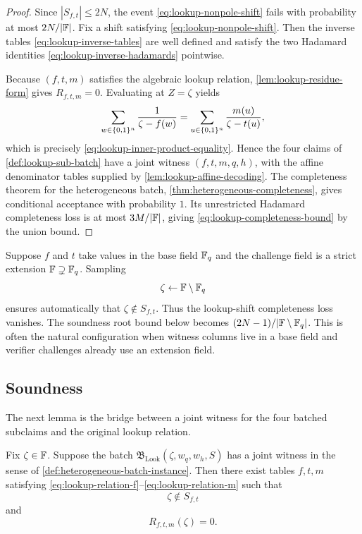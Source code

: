 \begin{proof}
Since $|S_{f,t}|\le2N$, the event \eqref{eq:lookup-nonpole-shift} fails with probability at most $2N/|\mathbb{F}|$.  Fix a shift satisfying \eqref{eq:lookup-nonpole-shift}.  Then the inverse tables \eqref{eq:lookup-inverse-tables} are well defined and satisfy the two Hadamard identities \eqref{eq:lookup-inverse-hadamards} pointwise.

Because $(f,t,m)$ satisfies the algebraic lookup relation, \cref{lem:lookup-residue-form} gives $R_{f,t,m}=0$.  Evaluating at $Z=\zeta$ yields
\[
  \sum_{w\in\{0,1\}^n}\frac{1}{\zeta-f(w)}
  =
  \sum_{u\in\{0,1\}^n}\frac{m(u)}{\zeta-t(u)},
\]
which is precisely \eqref{eq:lookup-inner-product-equality}.  Hence the four claims of \cref{def:lookup-sub-batch} have a joint witness $(f,t,m,q,h)$, with the affine denominator tables supplied by \cref{lem:lookup-affine-decoding}.  The completeness theorem for the heterogeneous batch, \cref{thm:heterogeneous-completeness}, gives conditional acceptance with probability $1$.  Its unrestricted Hadamard completeness loss is at most $3M/|\mathbb{F}|$, giving \eqref{eq:lookup-completeness-bound} by the union bound.
\end{proof}

\begin{remark}
\label{rem:lookup-extension-shift}
Suppose $f$ and $t$ take values in the base field $\mathbb{F}_q$ and the challenge field is a strict extension $\mathbb{F}\supsetneq\mathbb{F}_q$.  Sampling
\begin{equation}
  \zeta\leftarrow \mathbb{F}\setminus\mathbb{F}_q
  \label{eq:lookup-extension-challenge}
\end{equation}
ensures automatically that $\zeta\notin S_{f,t}$.  Thus the lookup-shift completeness loss vanishes.  The soundness root bound below becomes $(2N-1)/|\mathbb{F}\setminus\mathbb{F}_q|$.  This is often the natural configuration when witness columns live in a base field and verifier challenges already use an extension field.
\end{remark}

\subsection{Soundness}
\label{sec:lookup-soundness}

The next lemma is the bridge between a joint witness for the four batched subclaims and the original lookup relation.

\begin{lemma}
\label{lem:lookup-joint-witness}
Fix $\zeta\in\mathbb{F}$.  Suppose the batch $\mathfrak B_{\mathrm{Look}}(\zeta,w_q,w_h,S)$ has a joint witness in the sense of \cref{def:heterogeneous-batch-instance}.  Then there exist tables $f,t,m$ satisfying \eqref{eq:lookup-relation-f}--\eqref{eq:lookup-relation-m} such that
\begin{equation}
  \zeta\notin S_{f,t}
  \label{eq:lookup-joint-nonpole}
\end{equation}
and
\begin{equation}
  R_{f,t,m}(\zeta)=0.
  \label{eq:lookup-joint-rational-zero}
\end{equation}
\end{lemma}

